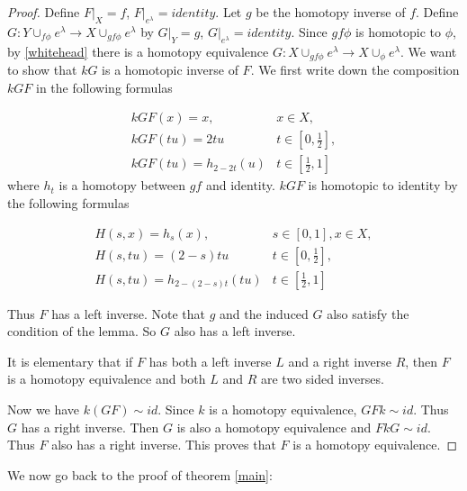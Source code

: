 \documentclass[a4paper,11pt,reqno]{amsart}
\begin{document}
\begin{proof}
  Define $F|_X = f$, $F|_{e^\lambda} = identity$. Let $g$ be the homotopy
  inverse of $f$. Define $G: Y \cup_{f\phi} e^\lambda \to X \cup_{gf\phi}
  e^\lambda$ by $G|_Y = g$, $G|_{e^\lambda} = identity$. Since $gf\phi$ is
  homotopic to $\phi$, by \ref{whitehead} there is a homotopy equivalence
  $G: X \cup_{gf\phi} e^\lambda \to X \cup_{\phi} e^\lambda$. We want to show
  that $kG$ is a homotopic inverse of $F$. We first write down the composition
  $kGF$ in the following formulas

  \begin{equation}
    \begin{array}{lcl}
      kGF(x) = x, & x \in X, \\
      kGF(tu) = 2tu & t \in [0,\frac{1}{2}], \\
      kGF(tu) = h_{2-2t}(u) & t \in [\frac{1}{2},1]
    \end{array}
  \end{equation}
  where $h_t$ is a homotopy between $gf$ and identity. $kGF$ is homotopic to
  identity by the following formulas

  \begin{equation}
    \begin{array}{lcl}
      H(s, x) = h_s(x), & s \in [0,1], x \in X,\\
      H(s, tu) = (2-s)tu & t \in [0,\frac{1}{2}], \\
      H(s, tu) = h_{2-(2-s)t}(tu) & t \in [\frac{1}{2},1]
    \end{array}
  \end{equation}
  
  Thus $F$ has a left inverse. Note that $g$ and the induced $G$ also satisfy
  the condition of the lemma. So $G$ also has a left inverse.

  It is elementary that if $F$ has both a left inverse $L$ and a right inverse
  $R$, then $F$ is a homotopy equivalence and both $L$ and $R$ are two sided
  inverses.

  Now we have $k(GF) \sim id$. Since $k$ is a homotopy equivalence, $GFk \sim
  id$. Thus $G$ has a right inverse. Then $G$ is also a homotopy equivalence and
  $FkG \sim id$. Thus $F$ also has a right inverse. This proves that $F$ is a
  homotopy equivalence.
\end{proof}

We now go back to the proof of theorem \ref{main}:
\end{document}
